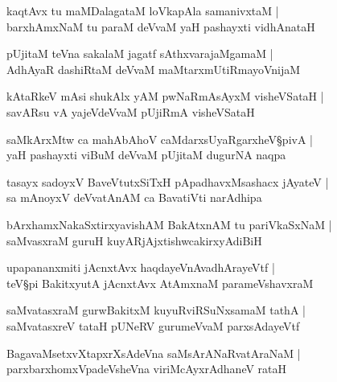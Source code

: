 \begin{shloka}
kaqtAvx tu maMDalagataM loVkapAla samanivxtaM |\\
barxhAmxNaM tu paraM deVvaM yaH pashayxti vidhAnataH 
\end{shloka}

\begin{shloka}
pUjitaM teVna sakalaM jagatf sAthxvarajaMgamaM |\\
AdhAyaR dashiRtaM deVvaM maMtarxmUtiRmayoVnijaM 
\end{shloka}

\begin{shloka}
kAtaRkeV  mAsi shukAlx yAM pwNaRmAsAyxM visheVSataH |\\
savARsu vA yajeVdeVvaM pUjiRmA visheVSataH 
\end{shloka}

\begin{shloka}
saMkArxMtw ca mahAbAhoV caMdarxsUyaRgarxheV\S pivA |\\
yaH pashayxti viBuM deVvaM pUjitaM dugurNA naqpa 
\end{shloka}

\begin{shloka}
tasayx sadoyxV BaveVtutxSiTxH pApadhavxMsashacx jAyateV |\\
sa mAnoyxV deVvatAnAM ca BavatiVti narAdhipa
\end{shloka}

\begin{shloka}
bArxhamxNakaSxtirxyavishAM BakAtxnAM tu pariVkaSxNaM |\\
saMvasxraM guruH kuyARjAjxtishwcakirxyAdiBiH
\end{shloka}

\begin{shloka}
upapananxmiti jAcnxtAvx haqdayeVnAvadhArayeVtf |\\
teV\S pi BakitxyutA jAcnxtAvx AtAmxnaM parameVshavxraM 
\end{shloka}

\begin{shloka}
saMvatasxraM gurwBakitxM kuyuRviRSuNxsamaM tathA |\\
saMvatasxreV tataH pUNeRV gurumeVvaM parxsAdayeVtf
\end{shloka}

\begin{shloka}
BagavaMsetxvXtapxrXsAdeVna saMsArANaRvatAraNaM |\\
parxbarxhomxVpadeVsheVna viriMcAyxrAdhaneV rataH 
\end{shloka}


